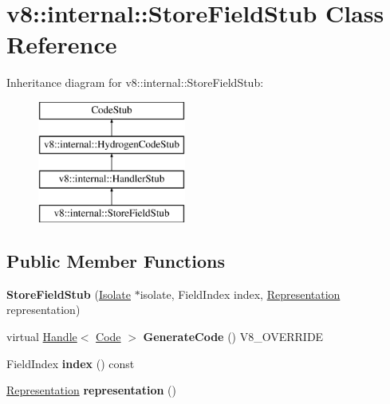 \hypertarget{classv8_1_1internal_1_1_store_field_stub}{}\section{v8\+:\+:internal\+:\+:Store\+Field\+Stub Class Reference}
\label{classv8_1_1internal_1_1_store_field_stub}
Inheritance diagram for v8\+:\+:internal\+:\+:Store\+Field\+Stub\+:\begin{figure}[H]
\begin{center}
\leavevmode
\includegraphics[height=4.000000cm]{classv8_1_1internal_1_1_store_field_stub}
\end{center}
\end{figure}
\subsection*{Public Member Functions}
\begin{DoxyCompactItemize}
\item 
\hypertarget{classv8_1_1internal_1_1_store_field_stub_aad2a3e75dd748e25e51b206b1d443bcc}{}{\bfseries Store\+Field\+Stub} (\hyperlink{classv8_1_1internal_1_1_isolate}{Isolate} $\ast$isolate, Field\+Index index, \hyperlink{classv8_1_1internal_1_1_representation}{Representation} representation)\label{classv8_1_1internal_1_1_store_field_stub_aad2a3e75dd748e25e51b206b1d443bcc}

\item 
\hypertarget{classv8_1_1internal_1_1_store_field_stub_ad4dd90fd2a88fb53d6dfd96af5c23309}{}virtual \hyperlink{classv8_1_1internal_1_1_handle}{Handle}$<$ \hyperlink{classv8_1_1internal_1_1_code}{Code} $>$ {\bfseries Generate\+Code} () V8\+\_\+\+O\+V\+E\+R\+R\+I\+D\+E\label{classv8_1_1internal_1_1_store_field_stub_ad4dd90fd2a88fb53d6dfd96af5c23309}

\item 
\hypertarget{classv8_1_1internal_1_1_store_field_stub_a99afd151b0ee91a6f8c8829d38eaf67d}{}Field\+Index {\bfseries index} () const \label{classv8_1_1internal_1_1_store_field_stub_a99afd151b0ee91a6f8c8829d38eaf67d}

\item 
\hypertarget{classv8_1_1internal_1_1_store_field_stub_ab3f244d75ec239100293d7c6af45ec92}{}\hyperlink{classv8_1_1internal_1_1_representation}{Representation} {\bfseries representation} ()\label{classv8_1_1internal_1_1_store_field_stub_ab3f244d75ec239100293d7c6af45ec92}

\end{DoxyCompactItemize}
